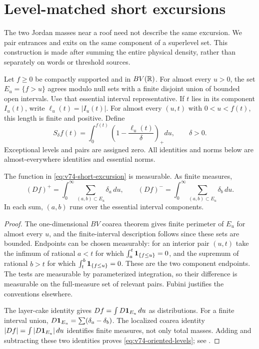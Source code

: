 \section{Level-matched short excursions}
\label{sec:v74-level-matching}
The two Jordan masses near a roof need not describe the same
excursion. We pair entrances and exits on the same component of a
superlevel set. This construction is made after summing the entire
physical density, rather than separately on words or threshold sources.

Let $f\ge0$ be compactly supported and in $BV(\mathbb R)$. For almost every
$u>0$, the set $E_u=\{f>u\}$ agrees modulo null sets with a finite
disjoint union of bounded open intervals. Use that essential interval
representative. If $t$ lies in its component $I_u(t)$, write
$\ell_u(t)=|I_u(t)|$. For almost every $(u,t)$ with $0<u<f(t)$,
this length is finite and positive. Define
\begin{equation}\label{eq:v74-short-excursion}
 S_\delta f(t)=\int_0^{f(t)}
              \left(1-\frac{\ell_u(t)}{\delta}\right)_+du,
 \qquad \delta>0.
\end{equation}
Exceptional levels and pairs are assigned zero. All identities and
norms below are almost-everywhere identities and essential norms.

\begin{lemma}
\label{lem:v74-level-coarea}
The function in \eqref{eq:v74-short-excursion} is measurable. As
finite measures,
\begin{equation}\label{eq:v74-oriented-levels}
 (Df)^+=\int_0^\infty\sum_{(a,b)\subset E_u}\delta_a\,du,
 \qquad
 (Df)^-=\int_0^\infty\sum_{(a,b)\subset E_u}\delta_b\,du.
\end{equation}
In each sum, $(a,b)$ runs over the essential interval components.
\end{lemma}
\begin{proof}
The one-dimensional $BV$ coarea theorem gives finite perimeter of
$E_u$ for almost every $u$, and the finite-interval description follows
since these sets are bounded. Endpoints can be chosen measurably:
for an interior pair $(u,t)$ take the infimum of rational $a<t$
for which $\int_a^t\mathbf1_{\{f\le u\}}=0$, and the supremum of rational
$b>t$ for which $\int_t^b\mathbf1_{\{f\le u\}}=0$. These are the two
component endpoints. The tests are measurable by parameterized
integration, so their difference is measurable on the full-measure
set of relevant pairs. Fubini justifies the conventions elsewhere.

The layer-cake identity gives $Df=\int D\mathbf1_{E_u}\,du$ as
distributions. For a finite interval union,
$D\mathbf1_{E_u}=\sum(\delta_a-\delta_b)$. The localized coarea identity
$|Df|=\int|D\mathbf1_{E_u}|\,du$ identifies finite measures, not only
total masses. Adding and subtracting these two identities proves
\eqref{eq:v74-oriented-levels}; see \cite[Chapter 3]{AFP}.
\end{proof}

